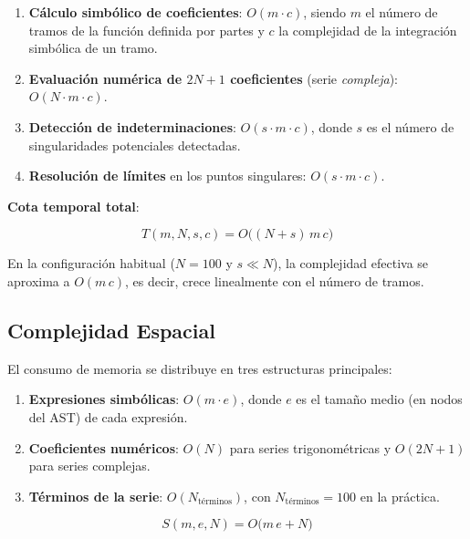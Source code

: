 \begin{enumerate}
	\item \textbf{Cálculo simbólico de coeficientes}: 
	$O(m \cdot c)$, siendo  
	$m$ el número de tramos de la función definida por partes y  
	$c$ la complejidad de la integración simbólica de un tramo.
	
	\item \textbf{Evaluación numérica de $2N + 1$ coeficientes} (serie
	\textit{compleja}): $O(N \cdot m \cdot c)$.
	
	\item \textbf{Detección de indeterminaciones}:  
	$O(s \cdot m \cdot c)$, donde $s$ es el número de singularidades
	potenciales detectadas.
	
	\item \textbf{Resolución de límites} en los puntos singulares:  
	$O(s \cdot m \cdot c)$.
\end{enumerate}

\noindent\textbf{Cota temporal total}:

\[
T(m,N,s,c)=O\!\bigl((N+s)\,m\,c\bigr)
\]

En la configuración habitual ($N=100$ y $s\ll N$),
la complejidad efectiva se aproxima a  
$O(m\,c)$, es decir, crece linealmente con el número de tramos.

\subsection{Complejidad Espacial}

El consumo de memoria se distribuye en tres estructuras principales:

\begin{enumerate}
	\item \textbf{Expresiones simbólicas}: $O(m \cdot e)$, donde
	$e$ es el tamaño medio (en nodos del AST) de cada expresión.
	\item \textbf{Coeficientes numéricos}:  
	$O(N)$ para series trigonométricas y $O(2N+1)$ para series complejas.
	\item \textbf{Términos de la serie}: $O(N_{\text{términos}})$, con
	$N_{\text{términos}}=100$ en la práctica.
\end{enumerate}

\[
S(m,e,N)=O\!\bigl(m\,e+N\bigr)
\]

